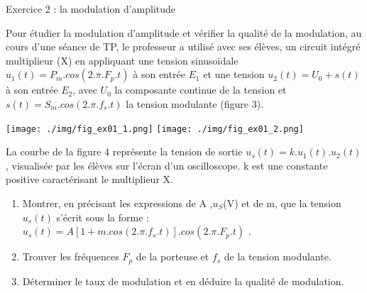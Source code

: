\documentclass[12pt, french]{article}
\begin{document}
\begin{Box2}{Exercice 2 : la modulation d’amplitude }

Pour étudier la modulation d’amplitude et vérifier la qualité de la modulation, au cours d’une séance de TP, le
professeur a utilisé avec ses élèves, un circuit intégré multiplieur (X)
en appliquant une tension sinusoïdale $u_1(t) = P_m.cos(2.\pi.F_p.t)$ à son
entrée $E_1$ et une tension $u_2(t) = U_0 + s(t)$ à son entrée $E_2$, avec $U_0$ la composante continue de la tension et $s(t)=S_m.cos(2.\pi.f_s.t)$ la tension modulante (figure 3).
  \begin{center}
	  \vspace{-0.6cm}
	\texttt{[image: ./img/fig\_ex01\_1.png]}
	\texttt{[image: ./img/fig\_ex01\_2.png]}
  \end{center}
La courbe de la figure 4 représente la tension de sortie
$u_s(t) = k.u_1(t).u_2(t)$, visualisée par les élèves sur l’écran d’un
oscilloscope. k est une constante positive caractérisant le multiplieur
X.

\begin{enumerate}
	\item Montrer, en précisant les expressions de A ,$u_S$(V) et de m, que
la tension $u_s(t)$ s’écrit sous la forme : $u_s(t) = A[1+m.cos(2.\pi.f_s.t)].cos(2.\pi.F_p.t)$ .

\item Trouver les fréquences $F_p$ de la porteuse et $f_s$ de la
tension modulante.

\item Déterminer le taux de modulation et en déduire la qualité
de modulation.

\end{enumerate}

\end{Box2}
\end{document}
